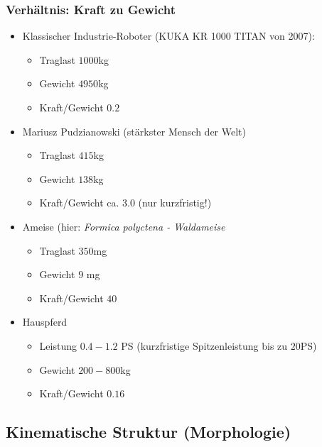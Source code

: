 \subsubsection{Verhältnis: Kraft zu Gewicht}
\begin{itemize}
	\item Klassischer Industrie-Roboter (KUKA KR 1000 TITAN von 2007):
	\begin{itemize}
		\item Traglast $1000$kg
		\item Gewicht $4950$kg
		\item Kraft/Gewicht $0.2$
	\end{itemize}
	\item Mariusz Pudzianowski (\glqq stärkster Mensch der Welt\grqq)
	\begin{itemize}
		\item Traglast $415$kg
		\item Gewicht $138$kg
		\item Kraft/Gewicht ca. $3.0$ (nur kurzfristig!)
	\end{itemize}
	\item Ameise (hier: \textit{Formica polyctena - Waldameise}
	\begin{itemize}
		\item Traglast $350$mg
		\item Gewicht $9$ mg
		\item Kraft/Gewicht $40$
	\end{itemize}
	\item Hauspferd
	\begin{itemize}
		\item Leistung $0.4 - 1.2$ PS (kurzfristige Spitzenleistung bis zu $20$PS)
		\item Gewicht $200-800$kg
		\item Kraft/Gewicht $0.16$
	\end{itemize}
\end{itemize}

\subsection{Kinematische Struktur (Morphologie)}

